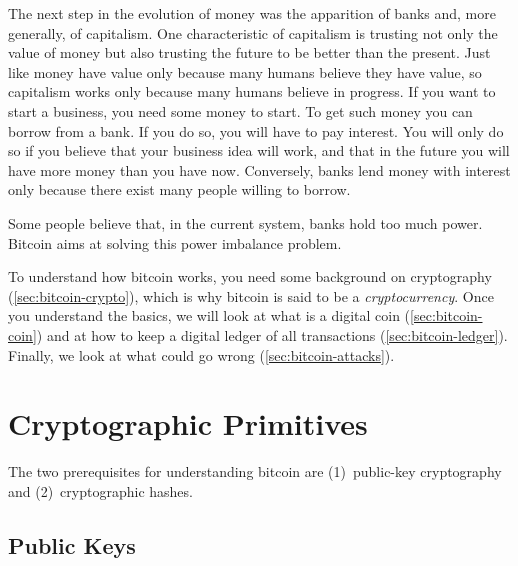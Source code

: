 The next step in the evolution of money was the apparition of banks and, more generally, of capitalism.
One characteristic of capitalism is trusting not only the value of money but also trusting the future to be better than the present.
Just like money have value only because many humans believe they have value, so capitalism works only because many humans believe in progress.
If you want to start a business, you need some money to start.
To get such money you can borrow from a bank.
If you do so, you will have to pay interest.
You will only do so if you believe that your business idea will work, and that in the future you will have more money than you have now.
Conversely, banks lend money with interest only because there exist many people willing to borrow.

Some people believe that, in the current system, banks hold too much power.
Bitcoin aims at solving this power imbalance problem.

To understand how bitcoin works, you need some background on cryptography (\autoref{sec:bitcoin-crypto}), which is why bitcoin is said to be a \emph{cryptocurrency}.
Once you understand the basics, we will look at what is a digital coin (\autoref{sec:bitcoin-coin}) and at how to keep a digital ledger of all transactions (\autoref{sec:bitcoin-ledger}).
Finally, we look at what could go wrong (\autoref{sec:bitcoin-attacks}).


\section{Cryptographic Primitives}\label{sec:bitcoin-crypto}

The two prerequisites for understanding bitcoin are (1)~public-key cryptography and (2)~cryptographic hashes.

\subsection{Public Keys}

